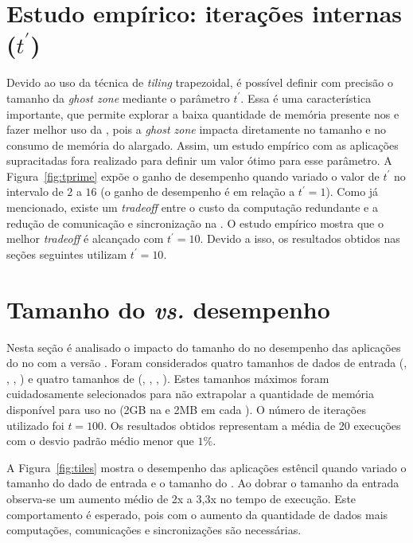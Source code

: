 \section{Estudo empírico: iterações internas (\texorpdfstring{$t^\prime$}{t'})}
\label{sec:tam_tile_alargado}

Devido ao uso da técnica de \textit{tiling} trapezoidal, é possível definir com precisão o tamanho da \textit{ghost zone} mediante o parâmetro $t^\prime$. Essa é uma característica importante, que permite explorar a baixa quantidade de memória presente nos \clusters e fazer melhor uso da \noc, pois a \textit{ghost zone} impacta diretamente no tamanho e no consumo de memória do \tile alargado. Assim, um estudo empírico com as aplicações supracitadas fora realizado para definir um valor ótimo para esse parâmetro. A Figura~\ref{fig:tprime} expõe o ganho de desempenho quando variado o valor de $t^\prime$ no intervalo de $2$ a $16$ (o ganho de desempenho é em relação a $t^\prime=1$). Como já mencionado, existe um \textit{tradeoff} entre o custo da computação redundante e a redução de comunicação e sincronização na \noc. O estudo empírico mostra que o melhor \textit{tradeoff} é alcançado com $t^\prime=10$. Devido a isso, os resultados obtidos nas seções seguintes utilizam $t^\prime=10$.



\section{Tamanho do \tile \textit{vs.} desempenho}
\label{sec:tam_tile_desempenho}

Nesta seção é analisado o impacto do tamanho do \tile no desempenho das aplicações do \pskel no \mppa com a versão \async. Foram considerados quatro tamanhos de dados de entrada (\ina, \inb, \inc, \ind) e quatro tamanhos de \tiles (\tilea, \tileb, \tilec, \tiled). Estes tamanhos máximos foram cuidadosamente selecionados para não extrapolar a quantidade de memória disponível para uso no \mppa (2GB na \lpddr e 2MB em cada \cluster). O número de iterações utilizado foi $t = 100$. Os resultados obtidos representam a média de 20 execuções com o desvio padrão médio menor que $1\%$. 

A Figura~\ref{fig:tiles} mostra o desempenho das aplicações estêncil quando variado o tamanho do dado de entrada e o tamanho do \tile. Ao dobrar o tamanho da entrada observa-se um aumento médio de 2x a 3,3x no tempo de execução. Este comportamento é esperado, pois com o aumento da quantidade de dados mais computações, comunicações e sincronizações são necessárias.


